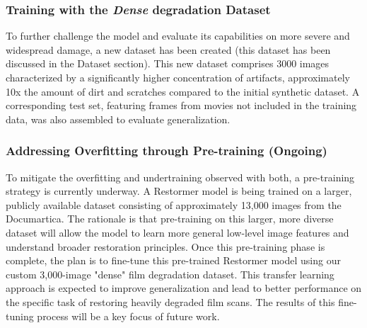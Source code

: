 \documentclass[openany, 12pt]{article}
\begin{document}
\subsubsection{Training with the \textit{Dense} degradation Dataset}
To further challenge the model and evaluate its capabilities on more severe and widespread damage, a new dataset has been created (this dataset has been discussed in the Dataset section). This new dataset comprises 3000 images characterized by a significantly higher concentration of artifacts, approximately 10x the amount of dirt and scratches compared to the initial synthetic dataset. A corresponding test set, featuring frames from movies not included in the training data, was also assembled to evaluate generalization.

\subsubsection{Addressing Overfitting through Pre-training (Ongoing)}
To mitigate the overfitting and undertraining observed with both, a pre-training strategy is currently underway. A Restormer model is being trained on a larger, publicly available dataset consisting of approximately 13,000 images from the Documartica. The rationale is that pre-training on this larger, more diverse dataset will allow the model to learn more general low-level image features and understand broader restoration principles. Once this pre-training phase is complete, the plan is to fine-tune this pre-trained Restormer model using our custom 3,000-image "dense" film degradation dataset. This transfer learning approach is expected to improve generalization and lead to better performance on the specific task of restoring heavily degraded film scans. The results of this fine-tuning process will be a key focus of future work.
\end{document}
